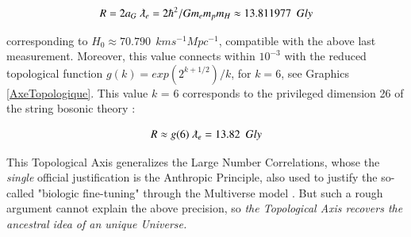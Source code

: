 \documentclass[a4paper,9pt]{article}
\begin{document}
\begin{equation}\label{Eq1}
R =2a_G ~\lambdabar_e  = 2 \hbar^2/Gm_e m_p m_H \approx 13.811977~~Gly 
 \end{equation}


corresponding to  $ H_0 \approx 70.790 ~~ km s^{-1} Mpc^{-1}$, compatible with the above last measurement. Moreover, this value connects within $10^{-3}$ with the reduced topological function $g(k) = exp(2^{k+1/2})/k$, for $k = 6 $, see Graphics \ref{AxeTopologique}. This value $k$ = 6  corresponds to the privileged dimension 26 of the string bosonic theory :  


\begin{equation}\label{Eq2}
R \approx g(6)~\lambdabar_e  = 13.82~~Gly
 \end{equation}


This Topological Axis generalizes the Large Number Correlations, whose the \textit{single} official justification is the Anthropic Principle, also used to justify the so-called "biologic fine-tuning" through the Multiverse model \cite {Rees}. But such a rough argument cannot explain the above precision, so \textit{the Topological Axis recovers the ancestral idea of an unique Universe.} 








%
\end{document}
